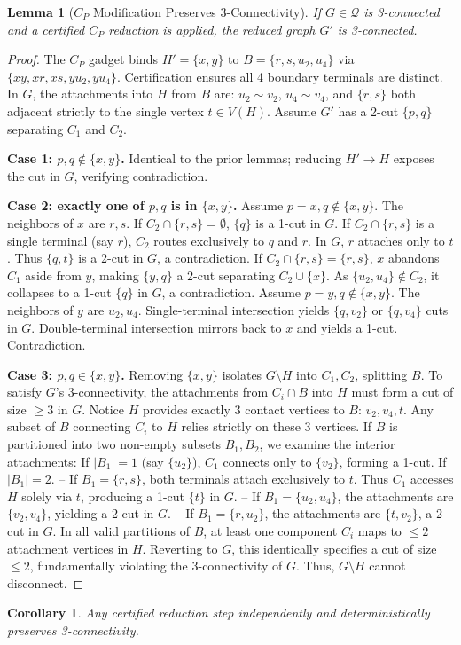 \documentclass[12pt]{article}
\newtheorem{lemma}[theorem]{Lemma}
\newtheorem{corollary}[theorem]{Corollary}
\begin{document}
\begin{lemma}[$C_P$ Modification Preserves 3-Connectivity]
\label{lem:app-cp-3conn}
If $G \in \mathcal{Q}$ is 3-connected and a certified $C_P$ reduction is applied, the reduced graph $G'$ is 3-connected.
\end{lemma}
\begin{proof}
The $C_P$ gadget binds $H' = \{x, y\}$ to $B = \{r, s, u_2, u_4\}$ via $\{xy, xr, xs, yu_2, yu_4\}$. Certification ensures all 4 boundary terminals are distinct.
In $G$, the attachments into $H$ from $B$ are: $u_2 \sim v_2$, $u_4 \sim v_4$, and $\{r, s\}$ both adjacent strictly to the single vertex $t \in V(H)$.
Assume $G'$ has a 2-cut $\{p, q\}$ separating $C_1$ and $C_2$.

\textbf{Case 1: $p, q \notin \{x, y\}$.}
Identical to the prior lemmas; reducing $H' \to H$ exposes the cut in $G$, verifying contradiction.

\textbf{Case 2: exactly one of $p, q$ is in $\{x, y\}$.}
Assume $p=x, q \notin \{x, y\}$. The neighbors of $x$ are $r, s$.
If $C_2 \cap \{r, s\} = \emptyset$, $\{q\}$ is a 1-cut in $G$.
If $C_2 \cap \{r, s\}$ is a single terminal (say $r$), $C_2$ routes exclusively to $q$ and $r$. In $G$, $r$ attaches only to $t$. Thus $\{q, t\}$ is a 2-cut in $G$, a contradiction.
If $C_2 \cap \{r, s\} = \{r, s\}$, $x$ abandons $C_1$ aside from $y$, making $\{y, q\}$ a 2-cut separating $C_2 \cup \{x\}$. As $\{u_2, u_4\} \notin C_2$, it collapses to a 1-cut $\{q\}$ in $G$, a contradiction.
Assume $p=y, q \notin \{x, y\}$. The neighbors of $y$ are $u_2, u_4$. Single-terminal intersection yields $\{q, v_2\}$ or $\{q, v_4\}$ cuts in $G$. Double-terminal intersection mirrors back to $x$ and yields a 1-cut. Contradiction.

\textbf{Case 3: $p, q \in \{x, y\}$.}
Removing $\{x, y\}$ isolates $G \setminus H$ into $C_1, C_2$, splitting $B$.
To satisfy $G$'s 3-connectivity, the attachments from $C_i \cap B$ into $H$ must form a cut of size $\ge 3$ in $G$.
Notice $H$ provides exactly 3 contact vertices to $B$: $v_2, v_4, t$. Any subset of $B$ connecting $C_i$ to $H$ relies strictly on these 3 vertices. If $B$ is partitioned into two non-empty subsets $B_1, B_2$, we examine the interior attachments:
If $|B_1| = 1$ (say $\{u_2\}$), $C_1$ connects only to $\{v_2\}$, forming a 1-cut.
If $|B_1| = 2$.
-- If $B_1 = \{r, s\}$, both terminals attach exclusively to $t$. Thus $C_1$ accesses $H$ solely via $t$, producing a 1-cut $\{t\}$ in $G$.
-- If $B_1 = \{u_2, u_4\}$, the attachments are $\{v_2, v_4\}$, yielding a 2-cut in $G$.
-- If $B_1 = \{r, u_2\}$, the attachments are $\{t, v_2\}$, a 2-cut in $G$.
In all valid partitions of $B$, at least one component $C_i$ maps to $\le 2$ attachment vertices in $H$. Reverting to $G$, this identically specifies a cut of size $\le 2$, fundamentally violating the 3-connectivity of $G$. Thus, $G \setminus H$ cannot disconnect.
\end{proof}

\begin{corollary}
Any certified reduction step independently and deterministically preserves 3-connectivity.
\end{corollary}
\end{document}
